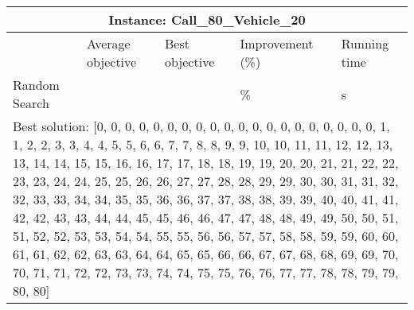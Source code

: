 \documentclass[]{article}
\begin{document}
\begin{table}[!ht]
	\hskip-1.3cm\begin{tabular}{|m{2.8cm}|>{\centering\arraybackslash}m{2.8cm}|>{\centering\arraybackslash}m{2.8cm}|>{\centering\arraybackslash}m{2.8cm}|>{\centering\arraybackslash}m{2.8cm}|}
		\hline
		\multicolumn{5}{|c|}{Instance: Call\_80\_Vehicle\_20}\\
		\hline
		& Average objective & Best objective & Improvement (\%) & Running time\\
		\hline
		Random Search & 46770347.00 & 46770347.00 & 0.000000 \% & 2.235 s\\
		\hline
		\multicolumn{5}{|m{14cm}|}{Best solution: [0, 0, 0, 0, 0, 0, 0, 0, 0, 0, 0, 0, 0, 0, 0, 0, 0, 0, 0, 0, 1, 1, 2, 2, 3, 3, 4, 4, 5, 5, 6, 6, 7, 7, 8, 8, 9, 9, 10, 10, 11, 11, 12, 12, 13, 13, 14, 14, 15, 15, 16, 16, 17, 17, 18, 18, 19, 19, 20, 20, 21, 21, 22, 22, 23, 23, 24, 24, 25, 25, 26, 26, 27, 27, 28, 28, 29, 29, 30, 30, 31, 31, 32, 32, 33, 33, 34, 34, 35, 35, 36, 36, 37, 37, 38, 38, 39, 39, 40, 40, 41, 41, 42, 42, 43, 43, 44, 44, 45, 45, 46, 46, 47, 47, 48, 48, 49, 49, 50, 50, 51, 51, 52, 52, 53, 53, 54, 54, 55, 55, 56, 56, 57, 57, 58, 58, 59, 59, 60, 60, 61, 61, 62, 62, 63, 63, 64, 64, 65, 65, 66, 66, 67, 67, 68, 68, 69, 69, 70, 70, 71, 71, 72, 72, 73, 73, 74, 74, 75, 75, 76, 76, 77, 77, 78, 78, 79, 79, 80, 80]}\\
		\hline
	\end{tabular}
\end{table}
\end{document}
